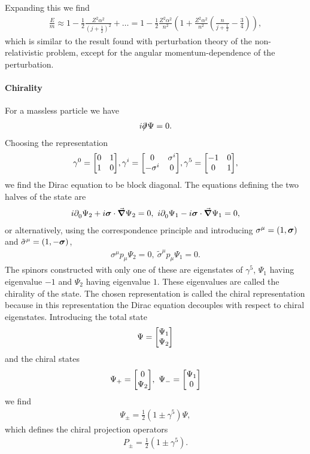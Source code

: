 Expanding this we find
\begin{align*}
	\frac{E}{m} \approx 1 - \frac{1}{2}\frac{Z^{2}\alpha^{2}}{\left(j + \frac{1}{2}\right)^{2}} + \dots = 1 - \frac{1}{2}\frac{Z^{2}\alpha^{2}}{n^{2}}\left(1 + \frac{Z^{2}\alpha^{2}}{n^{2}}\left(\frac{n}{j + \frac{1}{2}} - \frac{3}{4}\right)\right),
\end{align*}
which is similar to the result found with perturbation theory of the non-relativistic problem, except for the angular momentum-dependence of the perturbation.

\paragraph{Chirality}
For a massless particle we have
\begin{align*}
	i\slashed{\partial^{}_{}}\Psi = 0.
\end{align*}
Choosing the representation
\begin{align*}
	\gamma^{0} = \mqty[
		0 & 1 \\
		1 & 0
	], \gamma^{i} = \mqty[
		0           & \sigma^{i} \\
		-\sigma^{i} & 0
	],\gamma^{5} = \mqty[
		-1 & 0 \\
		0  & 1
	],
\end{align*}
we find the Dirac equation to be block diagonal. The equations defining the two halves of the state are
\begin{align*}
	i\del{}{0}\Psi_{2} + i\vb*{\sigma}\cdot\grad\Psi_{2} = 0,\ i\del{}{0}\Psi_{1} - i\vb*{\sigma}\cdot\grad\Psi_{1} = 0,
\end{align*}
or alternatively, using the correspondence principle and introducing $\sigma^{\mu} = (1, \vb*{\sigma})$ and $\tilde{\sigma}^{\mu} = (1, -\vb*{\sigma})$,
\begin{align*}
	\sigma^{\mu}p_{\mu}\Psi_{2} = 0,\ \tilde{\sigma}^{\mu}p_{\mu}\Psi_{1} = 0.
\end{align*}
The spinors constructed with only one of these are eigenstates of $\gamma^{5}$, $\Psi_{1}$ having eigenvalue $-1$ and $\Psi_{2}$ having eigenvalue $1$. These eigenvalues are called the chirality of the state. The chosen representation is called the chiral representation because in this representation the Dirac equation decouples with respect to chiral eigenstates. Introducing the total state
\begin{align*}
	\Psi = \mqty[
		\Psi_{1} \\
		\Psi_{2}
	]
\end{align*}
and the chiral states
\begin{align*}
	\Psi_{+} = \mqty[
		0 \\
		\Psi_{2}
	],\ \Psi_{-} = \mqty[
		\Psi_{1} \\
		0
	]
\end{align*}
we find
\begin{align*}
	\Psi_{\pm} = \frac{1}{2}(1 \pm \gamma^{5})\Psi,
\end{align*}
which defines the chiral projection operators
\begin{align*}
	P_{\pm} =  \frac{1}{2}(1 \pm \gamma^{5}).
\end{align*}

